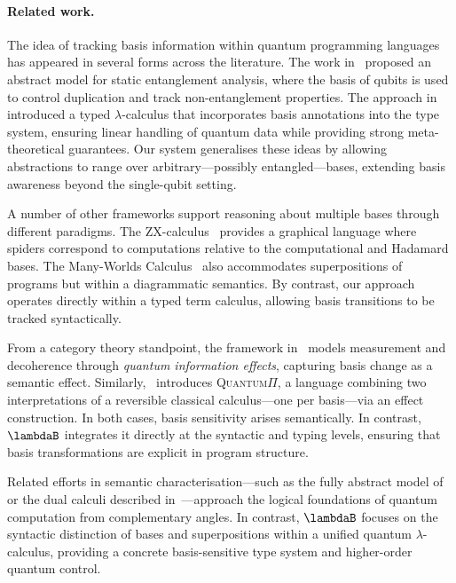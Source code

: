 \paragraph{Related work.}
The idea of tracking basis information within quantum programming languages has
appeared in several forms across the literature.  
The work in~\cite{Perdrix2008} proposed an abstract model for static
entanglement analysis, where the basis of qubits is used to control duplication
and track non-entanglement properties.  
The approach in~\cite{DiazcaroMonzonAPLAS25} introduced a typed
$\lambda$-calculus that incorporates basis annotations into the type system,
ensuring linear handling of quantum data while providing strong
meta-theoretical guarantees.  
Our system generalises these ideas by allowing abstractions to range over
arbitrary---possibly entangled---bases, extending basis awareness beyond the
single-qubit setting.

A number of other frameworks support reasoning about multiple bases through
different paradigms. The ZX-calculus~\cite{CoeckeRossICALP08} provides a
graphical language where spiders correspond to computations relative to the
computational and Hadamard bases. The 
Many-Worlds Calculus~\cite{ChardonnetdeVismeValironVilmartLMCS25} also accommodates
superpositions of programs but within a diagrammatic semantics.  
By contrast, our approach operates directly within a typed term calculus,
allowing basis transitions to be tracked syntactically.

From a category theory standpoint, the framework
in~\cite{HeunenKaarsgaard2021} models measurement and decoherence through
\emph{quantum information effects}, capturing basis change as a semantic
effect. Similarly,~\cite{CaretteHeunenKaarsgaardSabry2024} introduces
\textsc{Quantum}$\Pi$, a language combining two interpretations of a reversible
classical calculus—one per basis—via an effect construction.  
In both cases, basis sensitivity arises semantically.  
In contrast, $\lambdaB$ integrates it directly at the syntactic and typing
levels, ensuring that basis transformations are explicit in program structure.

Related efforts in semantic characterisation—such as the fully
abstract model of~\cite{ClairambaultdeVisme2019} or the dual calculi
described in~\cite{ChoudhuryGay2025}—approach the logical foundations of
quantum computation from complementary angles.  
In contrast, $\lambdaB$ focuses on the syntactic distinction of bases and
superpositions within a unified quantum $\lambda$-calculus, providing a concrete
basis-sensitive type system and higher-order quantum control.

